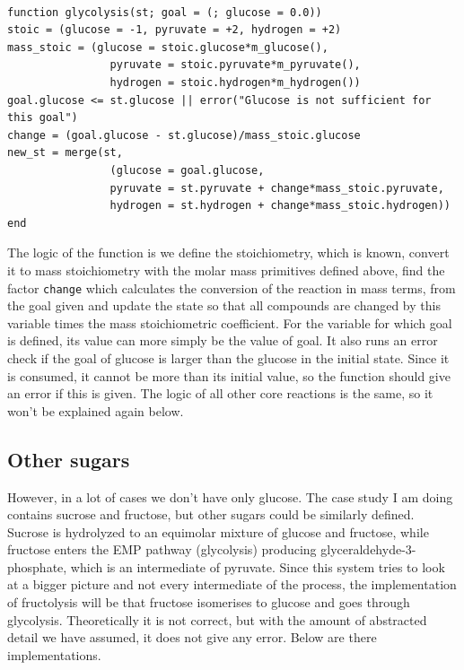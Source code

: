 \documentclass[11pt]{article}
\begin{document}
\begin{verbatim}

function glycolysis(st; goal = (; glucose = 0.0))
stoic = (glucose = -1, pyruvate = +2, hydrogen = +2)
mass_stoic = (glucose = stoic.glucose*m_glucose(),
                pyruvate = stoic.pyruvate*m_pyruvate(),
                hydrogen = stoic.hydrogen*m_hydrogen())
goal.glucose <= st.glucose || error("Glucose is not sufficient for this goal")
change = (goal.glucose - st.glucose)/mass_stoic.glucose
new_st = merge(st,
                (glucose = goal.glucose,
                pyruvate = st.pyruvate + change*mass_stoic.pyruvate,
                hydrogen = st.hydrogen + change*mass_stoic.hydrogen))
end

\end{verbatim}

The logic of the function is we define the stoichiometry, which is known, convert it to mass stoichiometry with the molar mass primitives defined above, find the factor \texttt{change} which calculates the conversion of the reaction in mass terms, from the goal given and update the state so that all compounds are changed by this variable times the mass stoichiometric coefficient. For the variable for which goal is defined, its value can more simply be the value of goal. It also runs an error check if the goal of glucose is larger than the glucose in the initial state. Since it is consumed, it cannot be more than its initial value, so the function should give an error if this is given. The logic of all other core reactions is the same, so it won't be explained again below. 

\subsection{Other sugars}
\label{sec:org833adf8}
However, in a lot of cases we don't have only glucose. The case study I am doing contains sucrose and fructose, but other sugars could be similarly defined. Sucrose is hydrolyzed to an equimolar mixture of glucose and fructose, while fructose enters the EMP pathway (glycolysis) producing glyceraldehyde-3-phosphate, which is an intermediate of pyruvate. Since this system tries to look at a bigger picture and not every intermediate of the process, the implementation of fructolysis will be that fructose isomerises to glucose and goes through glycolysis. Theoretically it is not correct, but with the amount of abstracted detail we have assumed, it does not give any error. Below are there implementations.
\end{document}
